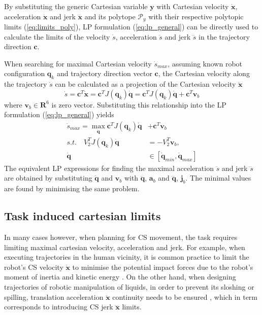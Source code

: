 

By substituting the generic Cartesian variable $\bm{y}$ with Cartesian velocity $\dot{\bm{x}}$, acceleration $\ddot{\bm{x}}$ and jerk $\dddot{\bm{x}}$ and its polytope $\mathcal{P}_y$  with their respective polytopic limits (\ref{eq:limits_poly}), LP formulation (\ref{eq:lp_general}) can be directly used to calculate the limits of the velocity $\dot{s}$, acceleration $\ddot{s}$ and jerk $\dddot{s}$ in the trajectory direction $\bm{c}$.  

When searching for maximal Cartesian velocity $\dot{s}_{max}$, assuming known robot configuration $\bm{q}_k$ and trajectory direction vector $\bm{c}$, the Cartesian velocity along the trajectory $\dot{s}$ can be calculated as a projection of the Cartesian velocity $\dot{\bm{x}}$ 
\begin{equation}
    \dot{s} = \bm{c}^T\dot{\bm{x}}= \bm{c}^TJ(\bm{q}_k)\dot{\bm{q}} = \bm{c}^TJ(\bm{q}_k)\dot{\bm{q}} + \bm{c}^T\bm{v}_b
\end{equation}
where $\bm{v}_b \in \bm{R}^6$ is zero vector. Substituting this relationship into the LP formulation (\ref{eq:lp_general}) yields 
\begin{equation}
\begin{split}
    \dot{s}_{max} = \max_{\dot{\bm{q}}} \bm{c}^TJ(\bm{q}_k)\dot{\bm{q}} &+ \bm{c}^T\bm{v}_b  \\
    s.t.\quad V_2^TJ(\bm{q}_k)\dot{\bm{q}} &= - V_2^T\bm{v}_b, \\
    \dot{\bm{q}}&\in [\dot{\bm{q}}_{min}, \dot{\bm{q}}_{max}]
\end{split}\label{eq:lp_vel_max}
\end{equation}
The equivalent LP expressions for finding the maximal acceleration $\ddot{s}$ and jerk $\dddot{s}$ are obtained by substituting $\dot{\bm{q}}$ and $\bm{v}_b$ with  $\ddot{\bm{q}}$, $\bm{a}_b$ and $\dddot{\bm{q}}$, $\bm{j}_b$. The minimal values are found by minimising the same problem.

\subsection{Task induced cartesian limits}

In many cases however, when planning for CS movement, the task requires limiting maximal cartesian velocity, acceleration and jerk. For example, when executing trajectories in the human vicinity, it is common practice to limit the robot's CS velocity $\dot{\bm{x}}$ to minimise the potential impact forces due to the robot's moment of inertia \cite{smu} and kinetic energy \cite{joseph2020}.
On the other hand, when designing trajectories of robotic manipulation of liquids, in order to prevent its sloshing or spilling, translation acceleration $\ddot{\bm{x}}$ continuity needs to be ensured \cite{moriello2018}, which in term corresponds to introducing CS jerk $\dddot{\bm{x}}$ limits.

